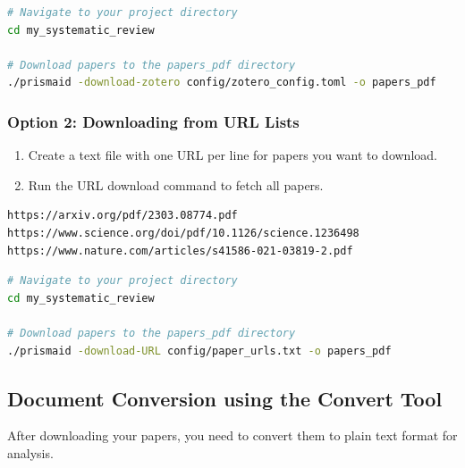 \begin{commandbox}
\begin{lstlisting}[language=Bash]
# Navigate to your project directory
cd my_systematic_review

# Download papers to the papers_pdf directory
./prismaid -download-zotero config/zotero_config.toml -o papers_pdf
\end{lstlisting}
\end{commandbox}

\subsubsection{Option 2: Downloading from URL Lists}
\begin{enumerate}
    \item Create a text file with one URL per line for papers you want to download.
    \item Run the URL download command to fetch all papers.
\end{enumerate}

\begin{infobox}
\begin{lstlisting}
https://arxiv.org/pdf/2303.08774.pdf
https://www.science.org/doi/pdf/10.1126/science.1236498
https://www.nature.com/articles/s41586-021-03819-2.pdf
\end{lstlisting}
\end{infobox}

\begin{commandbox}
\begin{lstlisting}[language=Bash]
# Navigate to your project directory
cd my_systematic_review

# Download papers to the papers_pdf directory
./prismaid -download-URL config/paper_urls.txt -o papers_pdf
\end{lstlisting}
\end{commandbox}



\subsection{Document Conversion using the Convert Tool}

After downloading your papers, you need to convert them to plain text format for analysis.

